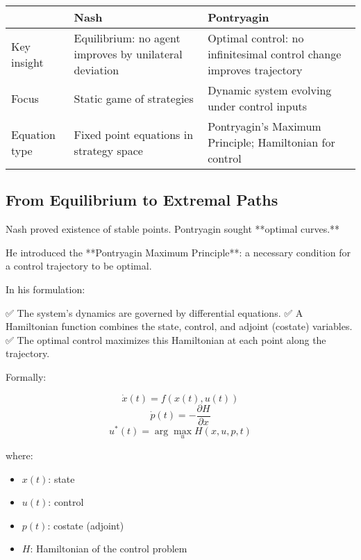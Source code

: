 \begin{tcolorbox}[colback=gray!5!white, colframe=black, title=\textbf{Sidebar: The Shift from Nash to Pontryagin}, fonttitle=\bfseries, arc=1.5mm, boxrule=0.4pt]

\begin{tabular}{>{\raggedright}p{4cm} >{\raggedright}p{5.5cm} >{\raggedright\arraybackslash}p{5.5cm}}
 & \textbf{Nash} & \textbf{Pontryagin} \\
\midrule
Key insight & Equilibrium: no agent improves by unilateral deviation & Optimal control: no infinitesimal control change improves trajectory \\
Focus & Static game of strategies & Dynamic system evolving under control inputs \\
Equation type & Fixed point equations in strategy space & Pontryagin’s Maximum Principle; Hamiltonian for control
\end{tabular}

\end{tcolorbox}

\bigskip

\subsection*{From Equilibrium to Extremal Paths}

Nash proved existence of stable points.  
Pontryagin sought **optimal curves.**

He introduced the **Pontryagin Maximum Principle**:  
a necessary condition for a control trajectory to be optimal.

In his formulation:

✅ The system’s dynamics are governed by differential equations.  
✅ A Hamiltonian function combines the state, control, and adjoint (costate) variables.  
✅ The optimal control maximizes this Hamiltonian at each point along the trajectory.

Formally:

\[
\dot{x}(t) = f(x(t), u(t))
\]
\[
\dot{p}(t) = -\frac{\partial H}{\partial x}
\]
\[
u^*(t) = \arg \max_u H(x, u, p, t)
\]

where:

\begin{itemize}
  \item \( x(t) \): state
  \item \( u(t) \): control
  \item \( p(t) \): costate (adjoint)
  \item \( H \): Hamiltonian of the control problem
\end{itemize}

